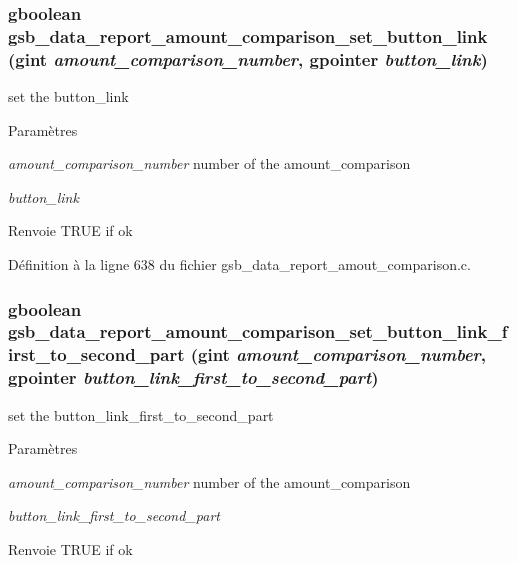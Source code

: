 \subsubsection[{gsb\_\-data\_\-report\_\-amount\_\-comparison\_\-set\_\-button\_\-link}]{\setlength{\rightskip}{0pt plus 5cm}gboolean gsb\_\-data\_\-report\_\-amount\_\-comparison\_\-set\_\-button\_\-link (gint {\em amount\_\-comparison\_\-number}, \/  gpointer {\em button\_\-link})}\label{gsb__data__report__amout__comparison_8c_a7c3f11144facc579886947e46cce5e4f}
set the button\_\-link


\begin{DoxyParams}{Paramètres}
\item[{\em amount\_\-comparison\_\-number}]number of the amount\_\-comparison \item[{\em button\_\-link}]\end{DoxyParams}
\begin{DoxyReturn}{Renvoie}
TRUE if ok 
\end{DoxyReturn}


Définition à la ligne 638 du fichier gsb\_\-data\_\-report\_\-amout\_\-comparison.c.

\subsubsection[{gsb\_\-data\_\-report\_\-amount\_\-comparison\_\-set\_\-button\_\-link\_\-first\_\-to\_\-second\_\-part}]{\setlength{\rightskip}{0pt plus 5cm}gboolean gsb\_\-data\_\-report\_\-amount\_\-comparison\_\-set\_\-button\_\-link\_\-first\_\-to\_\-second\_\-part (gint {\em amount\_\-comparison\_\-number}, \/  gpointer {\em button\_\-link\_\-first\_\-to\_\-second\_\-part})}\label{gsb__data__report__amout__comparison_8c_a087486603c2aee80b31256fde7a544b1}
set the button\_\-link\_\-first\_\-to\_\-second\_\-part


\begin{DoxyParams}{Paramètres}
\item[{\em amount\_\-comparison\_\-number}]number of the amount\_\-comparison \item[{\em button\_\-link\_\-first\_\-to\_\-second\_\-part}]\end{DoxyParams}
\begin{DoxyReturn}{Renvoie}
TRUE if ok 
\end{DoxyReturn}


